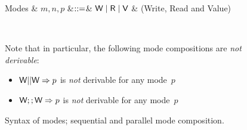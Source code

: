 \documentclass{llncs}
\begin{document}
\begin{figure}[htbp]
{
  \centering

\begin{grammar}
  Modes & $m,n,p$ &$\mathrel{::=}$& $\textsf{W} \mathrel{\mid} \textsf{R} \mathrel{\mid} \textsf{V}$ & (Write, Read and Value) 
\end{grammar}

\\[2mm]
}
Note that in particular, the following mode compositions are \emph{not derivable}:
\begin{itemize}
\item $\textsf{W} || \textsf{W} => p$ is \emph{not} derivable for any mode~$p$
\item $\textsf{W} ;; \textsf{W} => p$ is \emph{not} derivable for any mode~$p$
\end{itemize}
\caption{Syntax of modes; sequential and parallel mode composition.}
\label{fig:expr}
\end{figure}
\end{document}
